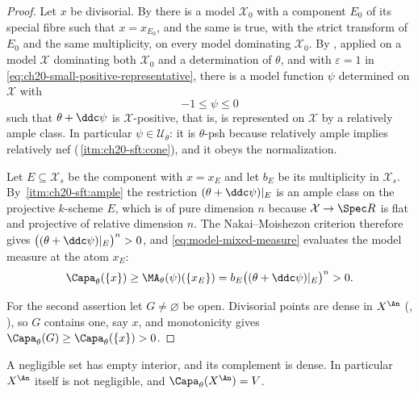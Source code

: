 \begin{proof}
Let \(x\) be divisorial.  By  there is
a model \(\mathcal X_0\) with a component \(E_0\) of its special fibre such
that \(x=x_{E_0}\), and the same is true, with the strict transform of
\(E_0\) and the same multiplicity, on every model dominating
\(\mathcal X_0\).  By , applied on a
model \(\mathcal X\) dominating both \(\mathcal X_0\) and a determination of
\(\theta\), and with \(\varepsilon=1\) in
\eqref{eq:ch20-small-positive-representative}, there is a model function
\(\psi\) determined on \(\mathcal X\) with
\[
                       -1\leq\psi\leq0
\]
such that \(\theta+\ddc\psi\) is \(\mathcal X\)-positive, that is, is
represented on \(\mathcal X\) by a relatively ample class.  In particular
\(\psi\in\mathcal U_\theta\): it is \(\theta\)-psh because relatively ample
implies relatively nef
(\,\cref{itm:ch20-sft:cone}), and it obeys
the normalization.

Let \(E\subseteq\mathcal X_s\) be the component with \(x=x_E\) and let
\(b_E\) be its multiplicity in \(\mathcal X_s\).  By
\,\cref{itm:ch20-sft:ample} the restriction
\((\theta+\ddc\psi)|_E\) is an ample class on the projective \(k\)-scheme
\(E\), which is of pure dimension \(n\) because
\(\mathcal X\to\Spec R\) is flat and projective of relative dimension \(n\).
The Nakai--Moishezon criterion therefore gives
\(\bigl((\theta+\ddc\psi)|_E\bigr)^n>0\), and
\eqref{eq:model-mixed-measure} evaluates the model measure at the atom
\(x_E\):
\begin{equation}
\label{eq:ch25-divisorial-atom}
 \Capa_\theta(\{x\})\geq\MA_\theta(\psi)(\{x_E\})
 =b_E\bigl((\theta+\ddc\psi)|_E\bigr)^n>0 .
\end{equation}

For the second assertion let \(G\neq\varnothing\) be open.  Divisorial points
are dense in \(X^{\An}\)
(, ),
so \(G\) contains one, say \(x\), and monotonicity gives
\(\Capa_\theta(G)\geq\Capa_\theta(\{x\})>0\).
\end{proof}

\begin{corollary}
\label{cor:ch25-negligible-empty-interior}
A negligible set has empty interior, and its complement is dense.  In
particular \(X^{\An}\) itself is not negligible, and
\(\Capa_\theta(X^{\An})=V\).
\end{corollary}

